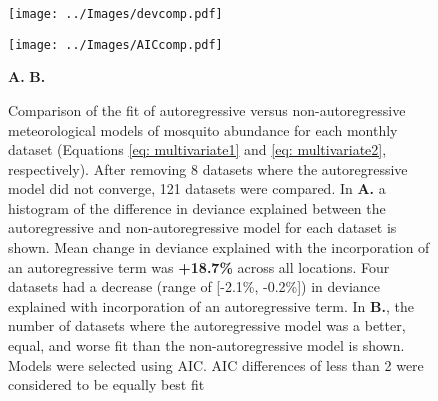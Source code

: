 \begin{figure}[b]
	
	\begin{minipage}{.5\textwidth}
		\centering
		\texttt{[image: ../Images/devcomp.pdf]}
	\end{minipage}
	\begin{minipage}{.5\textwidth}
		\centering
		\texttt{[image: ../Images/AICcomp.pdf]}
	\end{minipage}
	\begin{minipage}{\textwidth}
		\hspace{.25\textwidth}
		\textbf{A.}
		\hspace{.5\textwidth}
		\textbf{B.}
	\end{minipage}
	\caption{Comparison of the fit of autoregressive versus non-autoregressive meteorological models of mosquito abundance for each monthly dataset (Equations \ref{eq: multivariate1} and \ref{eq: multivariate2}, respectively). After removing 8 datasets where the autoregressive model did not converge, 121 datasets were compared. In \textbf{A.} a histogram of the difference in deviance explained between the autoregressive and non-autoregressive model for each dataset is shown. Mean change in deviance explained with the incorporation of an autoregressive term was \textbf{+18.7\%} across all locations. Four datasets had a decrease (range of [-2.1\%, -0.2\%]) in deviance explained with incorporation of an autoregressive term. In \textbf{B.}, the number of datasets where the autoregressive model was a better, equal, and worse fit than the non-autoregressive model is shown. Models were selected using AIC. AIC differences of less than 2 were considered to be equally best fit \citep{JOHNSON2004101} 
	}
\end{figure}